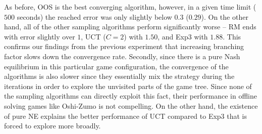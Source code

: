 As before, OOS is the best converging algorithm, however, in a given time limit ($500$ seconds) the reached error was only slightly below $0.3$ ($0.29$). On the other hand, all of the other sampling algorithms perform significantly worse -- RM ends with error slightly over $1$, UCT ($C=2$) with $1.50$, and Exp3 with $1.88$.
This confirms our findings from the previous experiment that increasing branching factor slows down the convergence rate.
Secondly, since there is a pure Nash equilibrium in this particular game configuration, the convergence of the algorithms is also slower since they essentially mix the strategy during the iterations in order to explore the unvisited parts of the game tree. Since none of the sampling algorithms can directly exploit this fact, their performance in offline solving games like Oshi-Zumo is not compelling. On the other hand, the existence of pure NE explains the better performance of UCT compared to Exp3 that is forced to explore more broadly.


